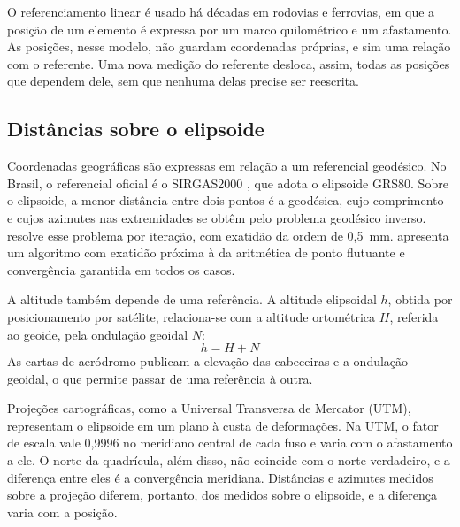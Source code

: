 O referenciamento linear é usado há décadas em rodovias e ferrovias, em que a posição de um elemento é expressa por um marco quilométrico e um afastamento. As posições, nesse modelo, não guardam coordenadas próprias, e sim uma relação com o referente. Uma nova medição do referente desloca, assim, todas as posições que dependem dele, sem que nenhuma delas precise ser reescrita.

\subsection{Distâncias sobre o elipsoide}\label{sec:geodesia}

Coordenadas geográficas são expressas em relação a um referencial geodésico. No Brasil, o referencial oficial é o SIRGAS2000 \cite{ibge2005sirgas}, que adota o elipsoide GRS80. Sobre o elipsoide, a menor distância entre dois pontos é a geodésica, cujo comprimento e cujos azimutes nas extremidades se obtêm pelo problema geodésico inverso.  resolve esse problema por iteração, com exatidão da ordem de 0,5~mm.  apresenta um algoritmo com exatidão próxima à da aritmética de ponto flutuante e convergência garantida em todos os casos.

A altitude também depende de uma referência. A altitude elipsoidal $h$, obtida por posicionamento por satélite, relaciona-se com a altitude ortométrica $H$, referida ao geoide, pela ondulação geoidal $N$:
\begin{equation}
    h = H + N
    \label{eq:ondulacao}
\end{equation}
As cartas de aeródromo publicam a elevação das cabeceiras e a ondulação geoidal, o que permite passar de uma referência à outra.

Projeções cartográficas, como a Universal Transversa de Mercator (UTM), representam o elipsoide em um plano à custa de deformações. Na UTM, o fator de escala vale 0,9996 no meridiano central de cada fuso e varia com o afastamento a ele. O norte da quadrícula, além disso, não coincide com o norte verdadeiro, e a diferença entre eles é a convergência meridiana. Distâncias e azimutes medidos sobre a projeção diferem, portanto, dos medidos sobre o elipsoide, e a diferença varia com a posição.

